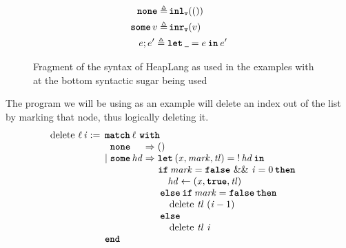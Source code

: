 \documentclass[thesis.tex]{subfiles}
\begin{document}
\begin{figure}[ht]
\begin{center}
\begin{align*}
      \None \eqdef                        & \InlV(\TT)                                                                   \\
      \Some \val \eqdef                   & \InrV(\val)                                                                  \\
      \expr; \expr' \eqdef{}              & \Let \any = \expr in \expr'
    \end{align*}
    \caption{Fragment of the syntax of HeapLang as used in the examples with at the bottom syntactic sugar being used}
    \label{fig:heaplangsyntax}
  \end{center}
\end{figure}

The program we will be using as an example will delete an index out of the list by marking that node, thus logically deleting it.
\begin{align*}
  \operatorname{delete}\,\loc\,\langv{i} :=\  & \MatchML{\loc\,}with{\None}=>{()}|{\Some \langv{hd}}=>{
  \Let (\lvar, \langv{mark}, \langv{tl}) = \deref \langv{hd} in                                                                                                                   \\
                                              &                                                         & \phantom{\Ra}\ \If \langv{mark} = \False\ \&\&\ \langv{i} = 0 then      \\
                                              &                                                         & \phantom{\Ra}\ \quad \langv{hd} \gets (\lvar, \True, \langv{tl})        \\
                                              &                                                         & \phantom{\Ra}\ \Else \If \langv{mark} = \False then                     \\
                                              &                                                         & \phantom{\Ra}\ \quad \operatorname{delete}\,\langv{tl}\ (\langv{i} - 1) \\
                                              &                                                         & \phantom{\Ra}\ \Else                                                    \\
                                              &                                                         & \phantom{\Ra}\ \quad \operatorname{delete}\,\langv{tl}\ \langv{i}
  }end{}
\end{align*}
\end{document}
